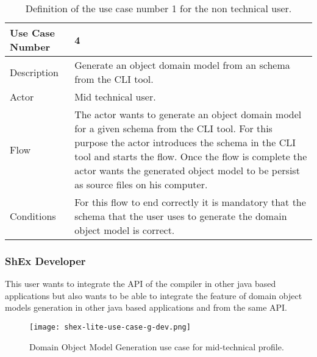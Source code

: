 \begin{table}[h]
    \begin{tabular}{ | m{2cm} | m{8cm}| }
        \hline
        Use Case Number & 4 \\
        \hline
        Description & Generate an object domain model from an schema from the CLI tool. \\
        \hline
        Actor & Mid technical user. \\
        \hline
        Flow & The actor wants to generate an object domain model for a given schema from the CLI tool.
        For this purpose the actor introduces the schema in the CLI tool and starts the flow. Once the
        flow is complete the actor wants the generated object model to be persist as source files on his
        computer. \\
        \hline
        Conditions & For this flow to end correctly it is mandatory that the schema that the user uses to
        generate the domain object model is correct. \\
        \hline
    \end{tabular}
    \caption[Definition of the use case number 1 for the non technical user]{Definition of the use case number 
    1 for the non technical user.}
\end{table}

\subsubsection{ShEx Developer}
This user wants to integrate the API of the compiler in other java based applications but also wants to be able to integrate
the feature of domain object models generation in other java based applications and from the same API.

\begin{figure}[h]
    \texttt{[image: shex-lite-use-case-g-dev.png]}
    \caption[Domain Object Model Generation use case for mid-technical profile]{Domain Object Model Generation use case for mid-technical profile.}
\end{figure}

